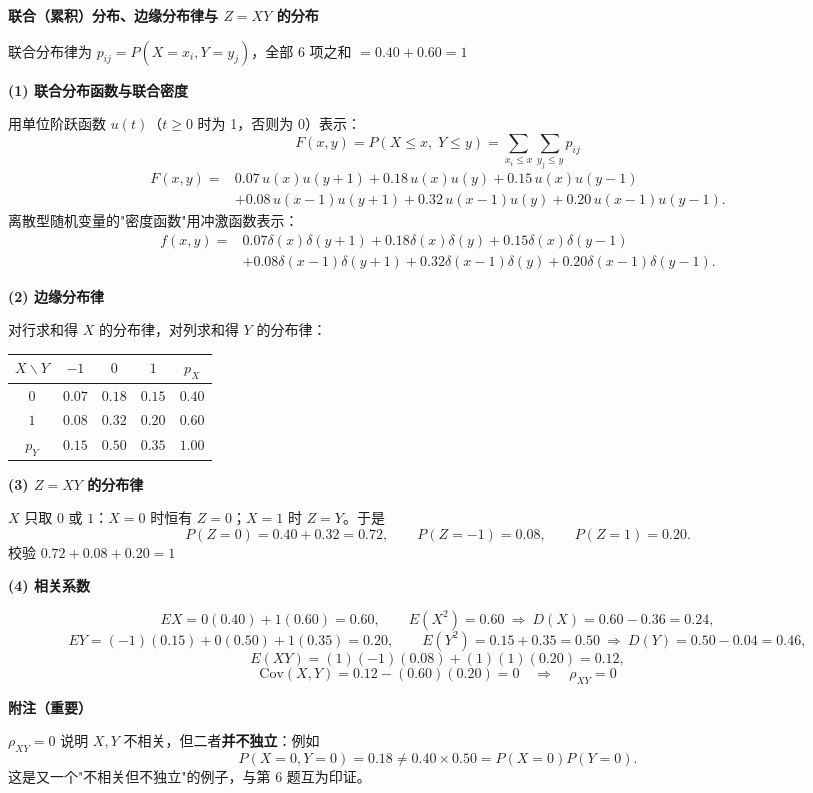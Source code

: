 \documentclass[10.5pt,fontset=fandol]{ctexart}
\newcommand{\key}[1]{\par\vspace{4pt}\noindent\textbf{\color{navy}#1}\par\vspace{2pt}}
\begin{document}
\noindent\textbf{联合（累积）分布、边缘分布律与 $Z=XY$ 的分布}\par\smallskip\begin{tcolorbox}[breakable,colback=qbg,colframe=qbg,boxrule=0pt]联合分布律为 $p_{ij}=P(X=x_i,Y=y_j)$，全部 6 项之和 $=0.40+0.60=1$ \checkmark

\key{(1) 联合分布函数与联合密度}
用单位阶跃函数 $u(t)$（$t\ge0$ 时为 1，否则为 0）表示：
\[
F(x,y)=P(X\le x,\;Y\le y)=\sum_{x_i\le x}\sum_{y_j\le y}p_{ij}
\]
\[
\begin{aligned}
F(x,y)={}&0.07\,u(x)u(y+1)+0.18\,u(x)u(y)+0.15\,u(x)u(y-1)\\
&+0.08\,u(x-1)u(y+1)+0.32\,u(x-1)u(y)+0.20\,u(x-1)u(y-1).
\end{aligned}
\]
离散型随机变量的"密度函数"用冲激函数表示：
\[
\begin{aligned}
f(x,y)={}&0.07\delta(x)\delta(y+1)+0.18\delta(x)\delta(y)+0.15\delta(x)\delta(y-1)\\
&+0.08\delta(x-1)\delta(y+1)+0.32\delta(x-1)\delta(y)+0.20\delta(x-1)\delta(y-1).
\end{aligned}
\]

\key{(2) 边缘分布律}
对行求和得 $X$ 的分布律，对列求和得 $Y$ 的分布律：
\begin{center}
\renewcommand{\arraystretch}{1.3}
\small
\begin{tabular}{c|ccc|c}
\toprule
$X\backslash Y$ & $-1$ & $0$ & $1$ & $p_{X}$ \\
\midrule
$0$ & $0.07$ & $0.18$ & $0.15$ & $\mathbf{0.40}$ \\
$1$ & $0.08$ & $0.32$ & $0.20$ & $\mathbf{0.60}$ \\
\midrule
$p_{Y}$ & $\mathbf{0.15}$ & $\mathbf{0.50}$ & $\mathbf{0.35}$ & $1.00$ \\
\bottomrule
\end{tabular}
\end{center}

\key{(3) $Z=XY$ 的分布律}
$X$ 只取 $0$ 或 $1$：$X=0$ 时恒有 $Z=0$；$X=1$ 时 $Z=Y$。于是
\[
P(Z=0)=0.40+0.32=0.72,\qquad
P(Z=-1)=0.08,\qquad
P(Z=1)=0.20 .
\]
校验 $0.72+0.08+0.20=1$ \checkmark

\key{(4) 相关系数}
\[
EX=0(0.40)+1(0.60)=0.60,\qquad E(X^2)=0.60\ \Rightarrow\ D(X)=0.60-0.36=0.24,
\]
\[
EY=(-1)(0.15)+0(0.50)+1(0.35)=0.20,\qquad E(Y^2)=0.15+0.35=0.50\ \Rightarrow\ D(Y)=0.50-0.04=0.46,
\]
\[
E(XY)=(1)(-1)(0.08)+(1)(1)(0.20)=0.12,
\]
\[
\mathrm{Cov}(X,Y)=0.12-(0.60)(0.20)=0
\quad\Longrightarrow\quad \boxed{\rho_{XY}=0}
\]

\key{附注（重要）}
$\rho_{XY}=0$ 说明 $X,Y$ 不相关，但二者\textbf{并不独立}：例如
\[
P(X=0,Y=0)=0.18\neq0.40\times0.50=P(X=0)P(Y=0).
\]
这是又一个"不相关但不独立"的例子，与第 6 题互为印证。
\end{tcolorbox}
\end{document}

